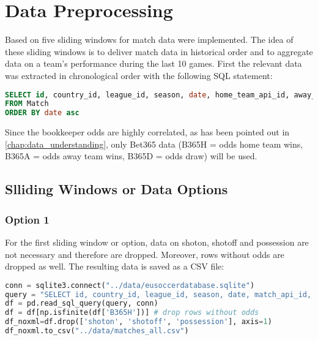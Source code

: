 
\chapter{Data Preprocessing}

Based on \cite{football-predictor} five sliding windows for match data were implemented. The idea of these sliding windows is to deliver match data in historical order and to aggregate data on a team's performance during the last 10 games.
First the relevant data was extracted in chronological order with the following SQL statement:

\begin{lstlisting}[language=SQL, caption=SQL code for Sliding Window]
SELECT id, country_id, league_id, season, date, home_team_api_id, away_team_api_id, home_team_goal, away_team_goal, B365H, B365D, B365A, shoton, shotoff, possession
FROM Match
ORDER BY date asc
\end{lstlisting}

Since the bookkeeper odds are highly correlated, as has been pointed out in \autoref{chap:data_understanding}, only Bet365 data (B365H = odds home team wins, B365A = odds away team wins, B365D = odds draw) will be used.


\section {Slliding Windows or Data Options}

\subsection {Option 1}
For the first sliding window or option, data on shoton, shotoff and possession are not necessary and therefore are dropped. Moreover, rows without odds are dropped as well. The resulting data is saved as a CSV file:


\begin{lstlisting}[language=Python, caption=Python code for matches\_all.csv]
conn = sqlite3.connect("../data/eusoccerdatabase.sqlite")
query = "SELECT id, country_id, league_id, season, date, match_api_id, home_team_api_id, away_team_api_id, home_team_goal, away_team_goal, B365H, B365D, B365A, shoton, shotoff, possession FROM Match ORDER BY date asc"
df = pd.read_sql_query(query, conn)
df = df[np.isfinite(df['B365H'])] # drop rows without odds
df_noxml=df.drop(['shoton', 'shotoff', 'possession'], axis=1)
df_noxml.to_csv("../data/matches_all.csv")
\end{lstlisting}

